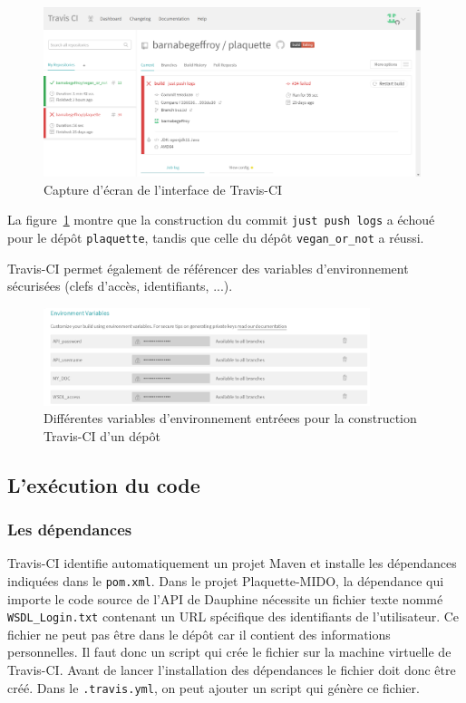 \begin{figure}[!ht]
    \begin{center}
        \includegraphics[width=11cm]{assets/travis-ci.PNG}
    \end{center}
    \caption{Capture d'écran de l'interface de Travis-CI}
    \label{travis}
\end{figure}

La figure~\ref{travis} montre que la construction du commit \texttt{just push logs} a échoué pour le dépôt \texttt{plaquette}, tandis que celle du dépôt \texttt{vegan\_or\_not} a réussi.

Travis-CI permet également de référencer des variables d'environnement sécurisées (clefs d'accès, identifiants, ...).
\begin{figure}[!ht]
    \begin{center}
    \includegraphics[width=0.85\textwidth]{assets/env.PNG}
    \caption{Différentes variables d'environnement entréees pour la construction Travis-CI d'un dépôt}
    \label{env}
    \end{center}

\end{figure}

\subsection{L'exécution du code}
\subsubsection*{Les dépendances}



Travis-CI identifie automatiquement un projet Maven et installe les dépendances indiquées dans le \texttt{pom.xml}. Dans le projet Plaquette-MIDO, la dépendance qui importe le code source de l'API de Dauphine nécessite un fichier texte nommé \texttt{WSDL\_Login.txt} contenant un URL spécifique des identifiants de l'utilisateur. Ce fichier ne peut pas être dans le dépôt car il contient des informations personnelles. Il faut donc un script qui crée le fichier sur la machine virtuelle de Travis-CI. Avant de lancer l'installation des dépendances le fichier doit donc être créé. Dans le \texttt{.travis.yml}, on peut ajouter un script qui génère ce fichier. 

